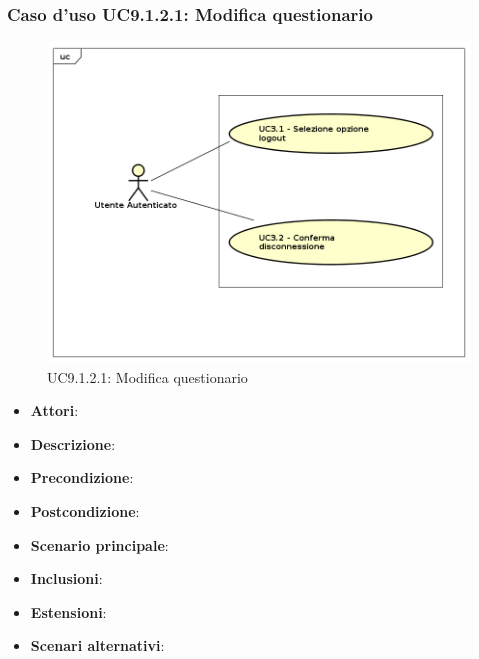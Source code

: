 			\subsubsection{Caso d'uso UC9.1.2.1: Modifica questionario}
			\label{UC9.1.2.1}
			\begin{figure}[h]
				\centering
			\includegraphics[scale=0.7,keepaspectratio]{UML/UC9.png}
				\caption{UC9.1.2.1: Modifica questionario}
			\end{figure}
			\FloatBarrier
			\begin{itemize}
				\item \textbf{Attori}: 
				\item \textbf{Descrizione}: 
				\item \textbf{Precondizione}: 
				\item \textbf{Postcondizione}: 
				\item \textbf{Scenario principale}:
				\item \textbf{Inclusioni}:
				\item \textbf{Estensioni}:
				\item \textbf{Scenari alternativi}:
			\end{itemize}
			
